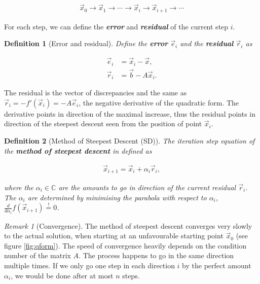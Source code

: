 \documentclass{article}
\theoremstyle{plain} %
\newtheorem{definition}{Definition}[section]
\theoremstyle{convention} %
\theoremstyle{remark} %
\newtheorem*{remark}{Remark} %
\def\df#1{\textbf{\textit{#1}}}
\numberwithin{equation}{section}
\begin{document}
\begin{align*}
    \vec{x}_0 \longrightarrow \vec{x}_1 \longrightarrow \dotsb \longrightarrow \vec{x}_i \longrightarrow \vec{x}_{i+1} \longrightarrow \dotsb
\end{align*}

For each step, we can define the \df{error} and \df{residual} of the current step $i$.

\begin{definition}[Error and residual]

Define the \df{error} $\vec{e}_i$ and the \df{residual} $\vec{r}_i$ as

\begin{subequations}
    \begin{align}
        \vec{e}_i &= \vec{x}_i - \vec{x}, \label{eq:error} \\
        \vec{r}_i &= \vec{b} - A \vec{x}_i. \label{eq:residual}
    \end{align}
\end{subequations}

\end{definition}

The residual is the vector of discrepancies and the same as $\vec{r}_i = -f'(\vec{x}_i) = -A \vec{e}_i$, the negative derivative of the quadratic form. The derivative points in direction of the maximal increase, thus the residual points in direction of the steepest descent seen from the position of point $\vec{x}_i$.

\begin{definition}[Method of Steepest Descent (SD)]
The iteration step equation of the \df{method of steepest descent} in defined as

\begin{align}
    \vec{x}_{i+1} = \vec{x}_i + \alpha_i \vec{r}_i \label{eq:steepest_descent},
\end{align}

where the $\alpha_i \in \mathbb{C}$ are the amounts to go in direction of the current residual $\vec{r}_i$. The $\alpha_i$ are determined by minimising the parabola with respect to $\alpha_i$, $\frac{d}{d \alpha_i} f(\vec{x}_{i+1}) \stackrel{!}{=} 0$.

\end{definition}

\begin{remark}[Convergence]
The method of steepest descent converges very slowly to the actual solution, when starting at an unfavourable starting point $\vec{x}_0$ (see figure \ref{fig:qform}). The speed of convergence heavily depends on the condition number of the matrix $A$. The process happens to go in the same direction multiple times. If we only go one step in each direction $i$ by the perfect amount $\alpha_i$, we would be done after at most $n$ steps.
\end{remark}
\end{document}
